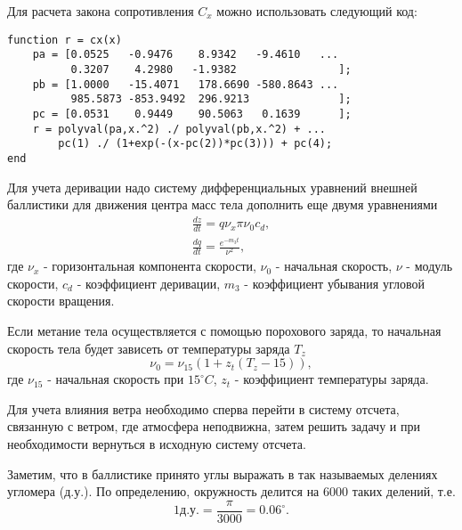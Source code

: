 Для расчета закона сопротивления $C_x$ можно использовать следующий код:
\begin{matlablisting}
	\begin{lstlisting}
function r = cx(x)
    pa = [0.0525   -0.9476    8.9342   -9.4610   ...
          0.3207    4.2980   -1.9382                ];
    pb = [1.0000   -15.4071   178.6690 -580.8643 ... 
          985.5873 -853.9492  296.9213              ];
    pc = [0.0531    0.9449    90.5063   0.1639      ];
    r = polyval(pa,x.^2) ./ polyval(pb,x.^2) + ...
        pc(1) ./ (1+exp(-(x-pc(2))*pc(3))) + pc(4);
end
	\end{lstlisting}
\end{matlablisting}
Для учета деривации надо систему дифференциальных уравнений внешней баллистики для движения центра масс тела дополнить еще двумя уравнениями
\begin{equation} \label{c13eq7}
	\begin{split}
		\frac{dz}{dt} = q \nu_x \pi \nu_0 c_d, \\
		\frac{dq}{dt} = \frac{e^{-m_3 t}}{\nu^2}, 
	\end{split}
\end{equation}
где $\nu_x$ - горизонтальная компонента скорости, $\nu_0$ - начальная скорость, $\nu$ - модуль скорости, $c_d$ - коэффициент деривации, $m_3$ - коэффициент убывания угловой скорости вращения.

Если метание тела осуществляется с помощью порохового заряда, то начальная скорость тела будет зависеть от температуры заряда $T_z$
\begin{equation} \label{c13eq8}
	\nu_0 = \nu_{15} \left( 1 + z_t \left( T_z - 15 \right) \right),
\end{equation}
где $\nu_{15}$ - начальная скорость при $15^\circ C$, $z_t$ - коэффициент температуры заряда.

Для учета влияния ветра необходимо сперва перейти в систему отсчета, связанную с ветром, где атмосфера неподвижна, затем решить задачу и при необходимости вернуться в исходную систему отсчета.

Заметим, что в баллистике принято углы выражать в так называемых делениях угломера (д.у.). По определению, окружность делится на 6000 таких делений, т.е.
\begin{equation} \label{c13eq9}
	1 \textit{д.у.} = \frac{\pi}{3000} = 0.06^\circ.
\end{equation}
